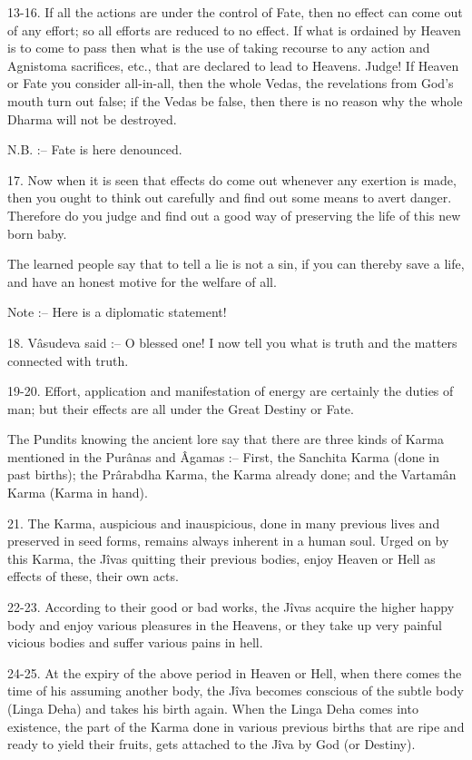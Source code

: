 13-16. If all the actions are under the control of Fate, then no effect can come out of any effort; so all efforts are reduced to no effect. If what is ordained by Heaven is to come to pass then what is the use of taking recourse to any action and Agnistoma sacrifices, etc., that are declared to lead to Heavens. Judge! If Heaven or Fate you consider all-in-all, then the whole Vedas, the revelations from God's mouth turn out false; if the Vedas be false, then there is no reason why the whole Dharma will not be destroyed.

N.B. :-- Fate is here denounced.

17. Now when it is seen that effects do come out whenever any exertion is made, then you ought to think out carefully and find out some means to avert danger. Therefore do you judge and find out a good way of preserving the life of this new born baby.

The learned people say that to tell a lie is not a sin, if you can thereby save a life, and have an honest motive for the welfare of all.

Note :-- Here is a diplomatic statement!

18. V\^asudeva said :-- O blessed one! I now tell you what is truth and the matters connected with truth.

19-20. Effort, application and manifestation of energy are certainly the duties of man; but their effects are all under the Great Destiny or Fate.

The Pundits knowing the ancient lore say that there are three kinds of Karma mentioned in the Pur\^anas and \^Agamas :-- First, the Sanchita Karma (done in past births); the Pr\^arabdha Karma, the Karma already done; and the Vartam\^an Karma (Karma in hand).

21. The Karma, auspicious and inauspicious, done in many previous lives and preserved in seed forms, remains always inherent in a human soul. Urged on by this Karma, the J\^ivas quitting their previous bodies, enjoy Heaven or Hell as effects of these, their own acts.

22-23. According to their good or bad works, the J\^ivas acquire the higher happy body and enjoy various pleasures in the Heavens, or they take up very painful vicious bodies and suffer various pains in hell.

24-25. At the expiry of the above period in Heaven or Hell, when there comes the time of his assuming another body, the J\^iva becomes conscious of the subtle body (Linga Deha) and takes his birth again. When the Linga Deha comes into existence, the part of the Karma done in various previous births that are ripe and ready to yield their fruits, gets attached to the J\^iva by God (or Destiny).

